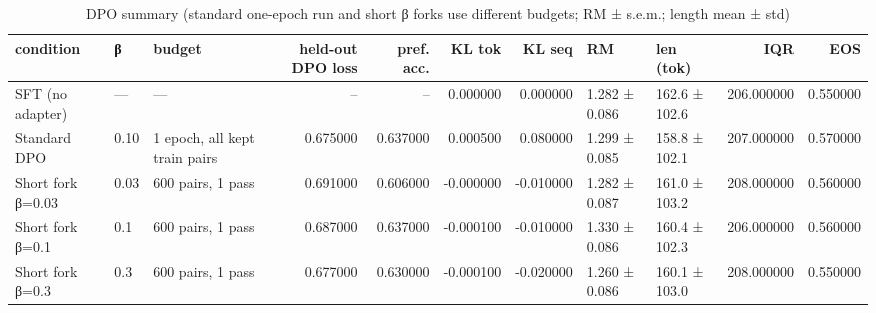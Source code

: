 \begin{table}
\caption{DPO summary (standard one-epoch run and short β forks use different budgets; RM ± s.e.m.; length mean ± std)}
\label{tab:t1_dpo_summary}
\begin{tabular}{lllrrrrllrr}
\toprule
condition & β & budget & held-out DPO loss & pref. acc. & KL tok & KL seq & RM & len (tok) & IQR & EOS \\
\midrule
SFT (no adapter) & — & — & -- & -- & 0.000000 & 0.000000 & 1.282 ± 0.086 & 162.6 ± 102.6 & 206.000000 & 0.550000 \\
Standard DPO & 0.10 & 1 epoch, all kept train pairs & 0.675000 & 0.637000 & 0.000500 & 0.080000 & 1.299 ± 0.085 & 158.8 ± 102.1 & 207.000000 & 0.570000 \\
Short fork β=0.03 & 0.03 & 600 pairs, 1 pass & 0.691000 & 0.606000 & -0.000000 & -0.010000 & 1.282 ± 0.087 & 161.0 ± 103.2 & 208.000000 & 0.560000 \\
Short fork β=0.1 & 0.1 & 600 pairs, 1 pass & 0.687000 & 0.637000 & -0.000100 & -0.010000 & 1.330 ± 0.086 & 160.4 ± 102.3 & 206.000000 & 0.560000 \\
Short fork β=0.3 & 0.3 & 600 pairs, 1 pass & 0.677000 & 0.630000 & -0.000100 & -0.020000 & 1.260 ± 0.086 & 160.1 ± 103.0 & 208.000000 & 0.550000 \\
\bottomrule
\end{tabular}
\end{table}
